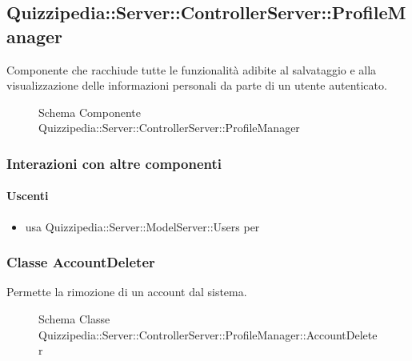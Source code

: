 \subsection{Quizzipedia::Server::ControllerServer::ProfileManager}
Componente che racchiude tutte le funzionalità adibite al salvataggio e alla visualizzazione delle informazioni personali da parte di un utente autenticato.
\begin{figure}[H]
\centering
\noindent{}
\caption[Schema Componente Quizzipedia::Server::ControllerServer::ProfileManager]{Schema Componente Quizzipedia::Server::ControllerServer::ProfileManager}
\end{figure}
\subsubsection{Interazioni con altre componenti}
\paragraph{Uscenti}
\begin{itemize}
\item usa Quizzipedia::Server::ModelServer::Users per 
\end{itemize}
\subsubsection{Classe AccountDeleter}
Permette la rimozione di un account dal sistema.
\begin{figure}[H]
\centering
\noindent{}
\caption[Schema Classe AccountDeleter]{Schema Classe Quizzipedia::Server::ControllerServer::ProfileManager::AccountDeleter}
\end{figure}
